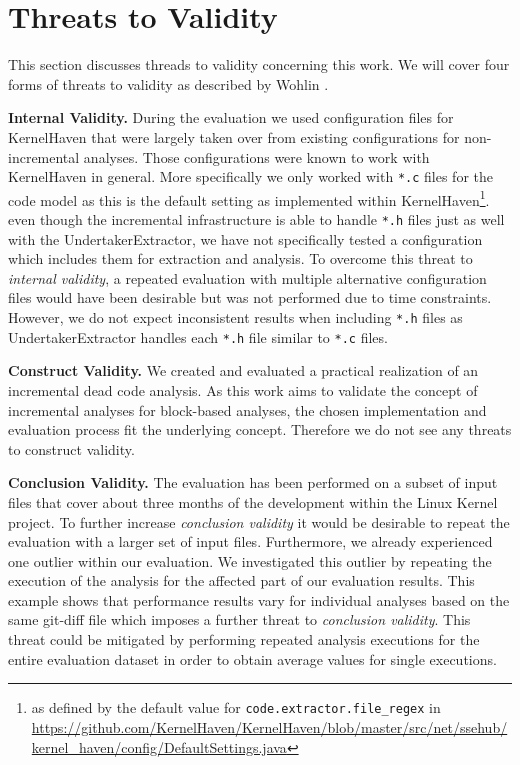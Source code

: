 \documentclass[a4paper]{article}
\begin{document}
\clearpage
\newpage

\section{Threats to Validity}\label{threats-to-validity}

This section discusses threads to validity concerning this work. We will cover four forms of threats to validity as described by Wohlin \cite{Wohlin:2000:ESE:330775}. 

\textbf{Internal Validity.} During the evaluation we used configuration files for KernelHaven that were largely taken over from existing configurations for non-incremental analyses. Those configurations were known to work with KernelHaven in general. More specifically we only worked with \texttt{*.c} files for the code model as this is the default setting as implemented within KernelHaven\footnote{as defined by the default value for \texttt{code.extractor.file\_regex} in \url{https://github.com/KernelHaven/KernelHaven/blob/master/src/net/ssehub/kernel_haven/config/DefaultSettings.java}}. even though the incremental infrastructure is able to handle \texttt{*.h} files just as well with the UndertakerExtractor, we have not specifically tested a configuration which includes them for extraction and analysis. To overcome this threat to \emph{internal validity}, a repeated evaluation with multiple alternative configuration files would have been desirable but was not performed due to time constraints. However, we do not expect inconsistent results when including \texttt{*.h} files as UndertakerExtractor handles each \texttt{*.h} file similar to \texttt{*.c} files.

\textbf{Construct Validity.} We created and evaluated a practical realization of an incremental dead code analysis. As this work aims to validate the concept of incremental analyses for block-based analyses, the chosen implementation and evaluation process fit the underlying concept. Therefore we do not see any threats to construct validity. 

\textbf{Conclusion Validity.} The evaluation has been performed on a subset of input files that cover about three months of the development within the Linux Kernel project. To further increase  \emph{conclusion validity} it would be desirable to repeat the evaluation with a larger set of input files. Furthermore, we already experienced one outlier within our evaluation.  We investigated this outlier by repeating the execution of the analysis for the affected part of our evaluation results. This example shows that  performance results vary for individual analyses based on the same git-diff file which imposes a further threat to \emph{conclusion validity}. This threat could be mitigated by performing repeated analysis executions for the entire evaluation dataset in order to obtain average values for single executions.
\end{document}
